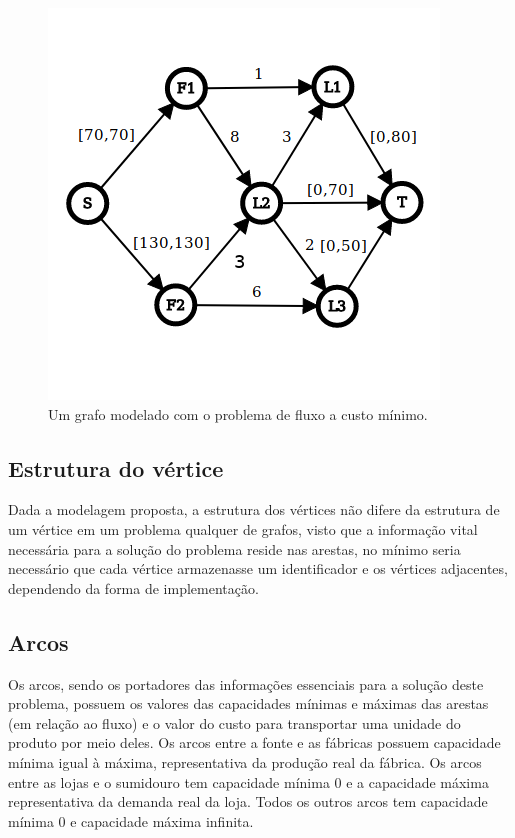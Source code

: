 \documentclass[12pt,a4]{article}
\begin{document}
\begin{figure}[H]
  \includegraphics[width=\linewidth]{grafo.png}
  \caption{Um grafo modelado com o problema de fluxo a custo mínimo.}
  \label{fig:modeled-graph}
\end{figure}

\subsection{Estrutura do vértice}
\label{subsec:vertex-structure}

Dada a modelagem proposta, a estrutura dos vértices não difere da estrutura de
um vértice em um problema qualquer de grafos, visto que a informação vital
necessária para a solução do problema reside nas arestas, no mínimo seria
necessário que cada vértice armazenasse um identificador e os vértices
adjacentes, dependendo da forma de implementação.

\subsection{Arcos}
\label{subsec:arches}

Os arcos, sendo os portadores das informações essenciais para a solução deste
problema, possuem os valores das capacidades mínimas e máximas das arestas (em
relação ao fluxo) e o valor do custo para transportar uma unidade do produto por
meio deles. Os arcos entre a fonte e as fábricas possuem capacidade mínima igual
à máxima, representativa da produção real da fábrica. Os arcos entre as lojas e
o sumidouro tem capacidade mínima 0 e a capacidade máxima representativa da
demanda real da loja. Todos os outros arcos tem capacidade mínima 0 e capacidade
máxima infinita.
\end{document}
